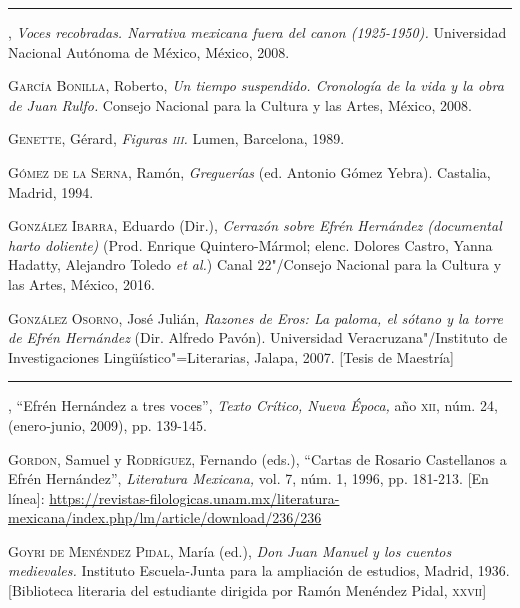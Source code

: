 \documentclass[14pt,twoside,final]{extbook} %
\begin{document}
\rule{1cm}{0.4pt}, \emph{Voces recobradas. Narrativa mexicana fuera del canon (1925-1950).} Universidad Nacional Autónoma de México, México, 2008.\label{bib:franco2008}

\textsc{García Bonilla}, Roberto, \emph{Un tiempo suspendido. Cronología de la vida y la obra de Juan Rulfo.} Consejo Nacional para la Cultura y las Artes, México, 2008.\label{bib:garcia2008}

\textsc{Genette}, Gérard, \emph{Figuras \textsc{iii}.} Lumen, Barcelona, 1989.\label{bib:genette1989}

\textsc{Gómez de la Serna}, Ramón, \emph{Greguerías} (ed. Antonio Gómez Yebra). Castalia, Madrid, 1994.\label{bib:gomez1994}

\textsc{González Ibarra}, Eduardo (Dir.), \emph{Cerrazón sobre Efrén Hernández (documental harto doliente)} (Prod. Enrique Quintero-Mármol; elenc. Dolores Castro, Yanna Hadatty, Alejandro Toledo \emph{et al.}) Canal 22"/Consejo Nacional para la Cultura y las Artes, México, 2016.\label{bib:gonzalez2016}

\textsc{González Osorno}, José Julián, \emph{Razones de Eros: \emph{La paloma, el sótano y la torre} de Efrén Hernández} (Dir. Alfredo Pavón). Universidad Veracruzana"/Instituto de Investigaciones Lingüístico"=Literarias, Jalapa, 2007. [Tesis de Maestría]\label{bib:gonzalez2007}

\rule{1cm}{0.4pt}, ``Efrén Hernández a tres voces'', \emph{Texto Crítico, Nueva Época,} año \textsc{xii}, núm. 24, (enero-junio, 2009), pp. 139-145.\label{bib:gonzalez2009}

\textsc{Gordon}, Samuel y \textsc{Rodríguez}, Fernando (eds.), ``Cartas de Rosario Castellanos a Efrén Hernández'', \emph{Literatura Mexicana,} vol. 7, núm. 1, 1996, pp. 181-213. [En línea]: \href{https://revistas-filologicas.unam.mx/literatura-mexicana/index.php/lm/article/download/236/236}{https://revistas-filologicas.unam.mx/literatura-mexicana/index.php/lm/article/download/236/236}\label{bib:gordon-rodriguez1996} 

\textsc{Goyri de Menéndez Pidal}, María (ed.), \emph{Don Juan Manuel y los cuentos medievales.} Instituto Escuela-Junta para la ampliación de estudios, Madrid, 1936. [Biblioteca literaria del estudiante dirigida por Ramón Menéndez Pidal, \textsc{xxvii}]\label{bib:goyri1936}
\end{document}
